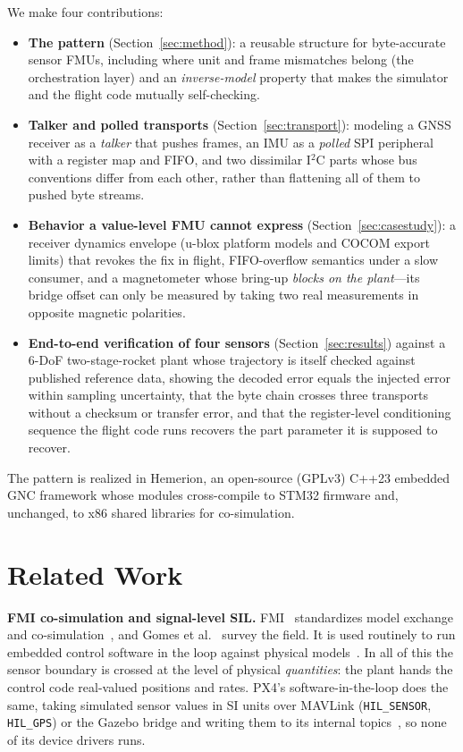 \documentclass[preprint,12pt,a4paper]{elsarticle}
\newcommand{\code}[1]{\texttt{\small #1}}
\begin{document}
We make four contributions:
\begin{itemize}
  \item \textbf{The pattern} (Section~\ref{sec:method}): a reusable structure
        for byte-accurate sensor FMUs, including where unit and frame mismatches
        belong (the orchestration layer) and an \emph{inverse-model} property
        that makes the simulator and the flight code mutually self-checking.
  \item \textbf{Talker and polled transports} (Section~\ref{sec:transport}):
        modeling a GNSS receiver as a \emph{talker} that pushes frames, an
        IMU as a \emph{polled} SPI peripheral with a register map and FIFO, and
        two dissimilar I$^2$C parts whose bus conventions differ from each
        other, rather than flattening all of them to pushed byte streams.
  \item \textbf{Behavior a value-level FMU cannot express}
        (Section~\ref{sec:casestudy}): a receiver dynamics envelope (u-blox
        platform models and COCOM export limits) that revokes the fix in flight,
        FIFO-overflow semantics under a slow consumer, and a magnetometer whose
        bring-up \emph{blocks on the plant}---its bridge offset can only be
        measured by taking two real measurements in opposite magnetic
        polarities.
  \item \textbf{End-to-end verification of four sensors}
        (Section~\ref{sec:results}) against a 6-DoF two-stage-rocket plant whose
        trajectory is itself checked against published reference data, showing
        the decoded error equals the injected error within sampling
        uncertainty, that the byte chain crosses three transports without a
        checksum or transfer error, and that the
        register-level conditioning sequence the flight code runs recovers the
        part parameter it is supposed to recover.
\end{itemize}
The pattern is realized in Hemerion, an open-source (GPLv3) C++23 embedded GNC
framework whose modules cross-compile to STM32 firmware and, unchanged, to
x86 shared libraries for co-simulation.

\section{Related Work}
\textbf{FMI co-simulation and signal-level SIL.} FMI~\cite{fmi2020} standardizes
model exchange and co-simulation~\cite{blochwitz2011fmi}, and Gomes et
al.~\cite{gomes2018cosim} survey the field. It is used routinely to run embedded
control software in the loop against physical
models~\cite{pedersen2016fmi,mikelsons2017virtual}. In all of this the sensor
boundary is crossed at the level of physical \emph{quantities}: the plant hands
the control code real-valued positions and rates. PX4's
software-in-the-loop does the same, taking simulated sensor values in SI units
over MAVLink (\code{HIL\_SENSOR}, \code{HIL\_GPS}) or the Gazebo bridge and
writing them to its internal topics~\cite{px4_sim}, so none of its device
drivers runs.
\end{document}
